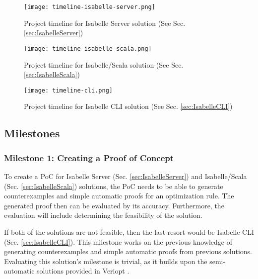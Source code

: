 \begin{figure}
    \centering
    \texttt{[image: timeline-isabelle-server.png]}
    \caption{Project timeline for Isabelle Server solution (See Sec. \ref{sec:IsabelleServer})}
    \label{fig:TimelineIsabelleServer}
\end{figure}

\begin{figure}
    \centering
    \texttt{[image: timeline-isabelle-scala.png]}
    \caption{Project timeline for Isabelle/Scala solution (See Sec. \ref{sec:IsabelleScala})}
    \label{fig:TimelineIsabelleScala}
\end{figure}

\begin{figure}
    \centering
    \texttt{[image: timeline-cli.png]}
    \caption{Project timeline for Isabelle CLI solution (See Sec. \ref{sec:IsabelleCLI})}
    \label{fig:TimelineIsabelleCLI}
\end{figure}

\pagebreak

\subsection{Milestones}
\label{sec:Milestones}

\subsubsection{Milestone 1: Creating a Proof of Concept}

To create a PoC for Isabelle Server (Sec. \ref{sec:IsabelleServer}) and Isabelle/Scala (Sec. \ref{sec:IsabelleScala})
solutions, the PoC needs to be able to generate counterexamples and simple automatic proofs for an optimization rule. 
The generated proof then can be evaluated by its accuracy. Furthermore, the evaluation will include determining the 
feasibility of the solution.

If both of the solutions are not feasible, then the last resort would be Isabelle CLI (Sec. \ref{sec:IsabelleCLI}).
This milestone works on the previous knowledge of generating counterexamples and simple automatic proofs 
from previous solutions. Evaluating this solution's milestone is trivial, as it builds upon the semi-automatic 
solutions provided in Veriopt \cite[Sec. 5.1]{Term_Graph_Optimizations}.

